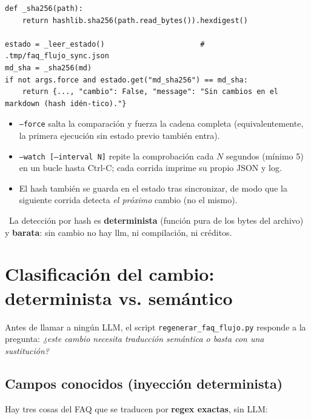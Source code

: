 \documentclass[11pt,a4paper]{article}
\begin{document}
\begin{lstlisting}
def _sha256(path):
    return hashlib.sha256(path.read_bytes()).hexdigest()

estado = _leer_estado()                      # .tmp/faq_flujo_sync.json
md_sha = _sha256(md)
if not args.force and estado.get("md_sha256") == md_sha:
    return {..., "cambio": False, "message": "Sin cambios en el markdown (hash idén-tico)."}
\end{lstlisting}

\begin{itemize}[leftmargin=1.4em]
  \item \texttt{--force} salta la comparación y fuerza la cadena completa (equivalentemente,
        la primera ejecución sin estado previo también entra).
  \item \texttt{--watch [--interval N]} repite la comprobación cada $N$ segundos (mínimo 5) en
        un bucle hasta Ctrl-C; cada corrida imprime su propio JSON y log.
  \item El hash también se guarda en el estado tras sincronizar, de modo que la siguiente
        corrida detecta \emph{el próximo} cambio (no el mismo).
\end{itemize}

\begin{tcolorbox}[cajaConcepto]
~La detección por hash es \textbf{determinista} (función pura de los
bytes del archivo) y \textbf{barata}: sin cambio no hay llm, ni compilación, ni créditos.
\end{tcolorbox}

\section{Clasificación del cambio: determinista vs. semántico}

\label{sec:clasific}
Antes de llamar a ningún LLM, el script \texttt{regenerar\_faq\_flujo.py} responde a la
pregunta: \emph{¿este cambio necesita traducción semántica o basta con una sustitución?}

\subsection{Campos conocidos (inyección determinista)}

Hay tres cosas del FAQ que se traducen por \textbf{regex exactas}, sin LLM:
\end{document}
